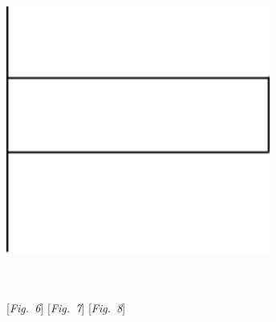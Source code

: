 \hspace{-9mm}
\begin{minipage}[t]{0.33\textwidth}
\includegraphics[width=0.65\textwidth]{gesamttex/edit_VIII,3/images/LH_35_14_02_046v,047v_d8.pdf}
\end{minipage}\vspace{-0.5em}
\\
\\
\hspace*{17mm} [\textit{Fig.~6}]\label{LH_35_14_02_046v,047v_Fig.6}\hspace*{31mm} [\textit{Fig.~7}]\label{LH_35_14_02_046v,047v_Fig.7}\hspace*{34mm} [\textit{Fig.~8}]\label{LH_35_14_02_046v,047v_Fig.8}
\vspace{1.5em}
\pend
